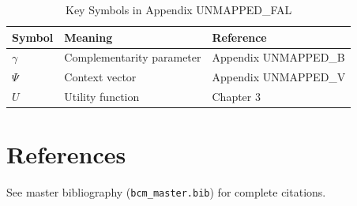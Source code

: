\begin{table}[htbp]
\centering
\caption{Key Symbols in Appendix UNMAPPED_FAL}
\begin{tabular}{lll}
\toprule
\textbf{Symbol} & \textbf{Meaning} & \textbf{Reference} \\
\midrule
$\gamma$ & Complementarity parameter & Appendix UNMAPPED_B \\
$\Psi$ & Context vector & Appendix UNMAPPED_V \\
$U$ & Utility function & Chapter 3 \\
\bottomrule
\end{tabular}
\end{table}


\section{References}
\label{sec:fal-references}

See master bibliography (\texttt{bcm\_master.bib}) for complete citations.

\nocite{bcm_master}

